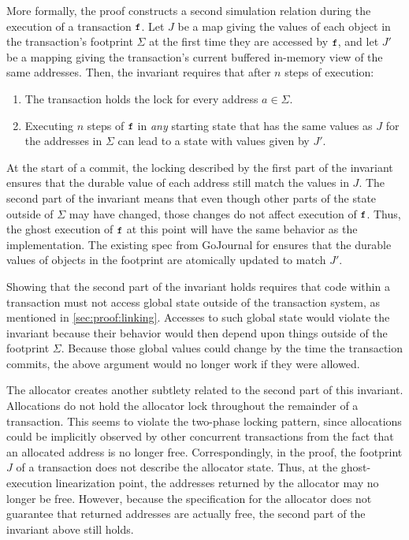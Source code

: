 More formally, the proof constructs a second simulation relation during the
execution of a transaction $\cc{f}$.  Let $J$ be a map giving the values of each
object in the transaction's footprint $\Sigma$ at the first time they are
accessed by $\cc{f}$, and let $J'$ be a mapping giving the transaction's current
buffered in-memory view of the same addresses.  Then, the invariant requires
that after $n$ steps of execution:
%
\begin{enumerate}

\item The transaction holds the lock for every address $a \in \Sigma$.

\item Executing $n$ steps of $\cc{f}$ in \emph{any} starting state that has the same
  values as $J$ for the addresses in $\Sigma$ can lead to a state with values given
  by $J'$.

\end{enumerate}
%
At the start of a commit, the locking described by the first part of the
invariant ensures that the durable value of each address still match the values
in $J$. The second part of the invariant means that even though other
parts of the state outside of $\Sigma$ may have changed, those changes do not
affect execution of $\cc{f}$. Thus, the ghost execution of $\cc{f}$ at this point will
have the same behavior as the implementation. The existing spec from GoJournal
for  ensures that the durable values of objects in the footprint are
atomically updated to match $J'$.


Showing that the second part of the invariant holds requires that code within a
transaction must not access global state outside of the
transaction system, as mentioned in \cref{sec:proof:linking}. Accesses to such global state
would violate the invariant because their behavior would then depend upon
things outside of the footprint $\Sigma$. Because those global values could change
by the time the transaction commits, the above argument would no longer work if they were allowed.

The allocator creates another subtlety related to the second part of this
invariant. Allocations do not hold the allocator lock throughout the remainder
of a transaction. This seems to violate the two-phase locking pattern, since
allocations could be implicitly observed by other concurrent transactions from
the fact that an allocated address is no longer free. Correspondingly, in the
proof, the footprint $J$ of a transaction does not describe the allocator state.
Thus, at the ghost-execution linearization point, the addresses returned by the
allocator may no longer be free. However, because the specification for the
allocator does not guarantee that returned addresses are actually free, the
second part of the invariant above still holds.

